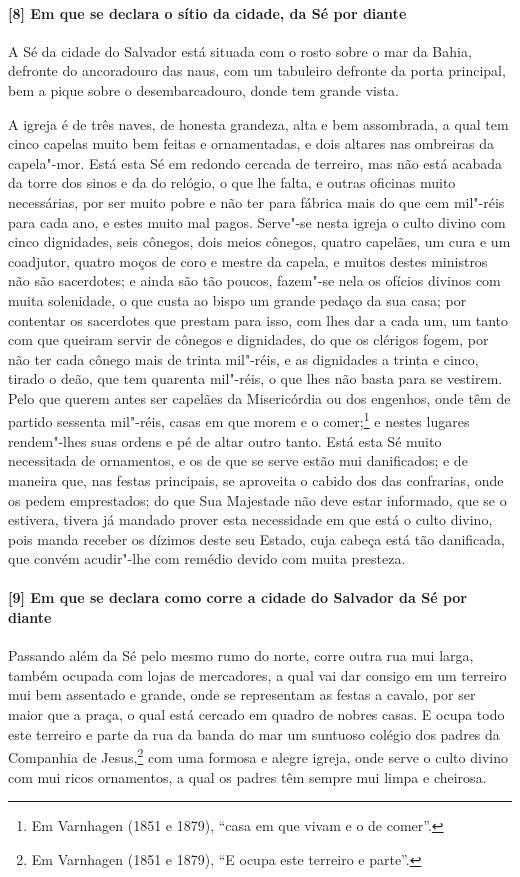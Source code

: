 \begin{linenumbers}
\paragraph{[8] Em que se declara o sítio da cidade, da Sé por diante} \quad
A Sé da cidade do Salvador está situada com o rosto sobre o mar da Bahia, defronte do
ancoradouro das naus, com um tabuleiro defronte da porta principal, bem a pique sobre o
desembarcadouro, donde tem grande vista.

A igreja é de três naves, de honesta grandeza, alta e bem assombrada, a qual tem cinco
capelas muito bem feitas e ornamentadas, e dois altares nas ombreiras da capela"-mor. Está
esta Sé em redondo cercada de terreiro, mas não está acabada da torre dos sinos e da do
relógio, o que lhe falta, e outras oficinas muito necessárias, por ser muito pobre e não
ter para fábrica mais do que cem mil"-réis para cada ano, e estes muito mal pagos. Serve"-se
nesta igreja o culto divino com cinco dignidades, seis cônegos, dois meios cônegos, quatro
capelães, um cura e um coadjutor, quatro moços de coro e mestre da capela, e muitos destes
ministros não são sacerdotes; e ainda são tão poucos, fazem"-se nela os ofícios divinos com
muita solenidade, o que custa ao bispo um grande pedaço da sua casa; por contentar os
sacerdotes que prestam para isso, com lhes dar a cada um, um tanto com que queiram servir
de cônegos e dignidades, do que os clérigos fogem, por não ter cada cônego mais de trinta
mil"-réis, e as dignidades a trinta e cinco, tirado o deão, que tem quarenta mil"-réis, o
que lhes não basta para se vestirem. Pelo que querem antes ser capelães da Misericórdia ou
dos engenhos, onde têm de partido sessenta mil"-réis, casas em que morem e o
comer;\footnote{ Em Varnhagen (1851 e 1879), ``casa em que vivam e o de comer''.} e nestes
lugares rendem"-lhes suas ordens e pé de altar outro tanto. Está esta Sé muito necessitada
de ornamentos, e os de que se serve estão mui danificados; e de maneira que, nas festas
principais, se aproveita o cabido dos das confrarias, onde os pedem emprestados; do que
Sua Majestade não deve estar informado, que se o estivera, tivera já mandado prover esta
necessidade em que está o culto divino, pois manda receber os dízimos deste seu Estado,
cuja cabeça está tão danificada, que convém acudir"-lhe com remédio devido com muita
presteza.

\paragraph{[9] Em que se declara como corre a cidade do Salvador da Sé por diante} \quad
Passando além da Sé pelo mesmo rumo do norte, corre outra rua mui larga, também ocupada
com lojas de mercadores, a qual vai dar consigo em um terreiro mui bem assentado e grande,
onde se representam as festas a cavalo, por ser maior que a praça, o qual está cercado em
quadro de nobres casas. E ocupa todo este terreiro e parte da rua da banda do mar um
suntuoso colégio dos padres da Companhia de Jesus,\footnote{ Em Varnhagen (1851 e 1879),
``E ocupa este terreiro e parte''.} com uma formosa e alegre igreja, onde serve o culto
divino com mui ricos ornamentos, a qual os padres têm sempre mui limpa e cheirosa.


\end{linenumbers}

